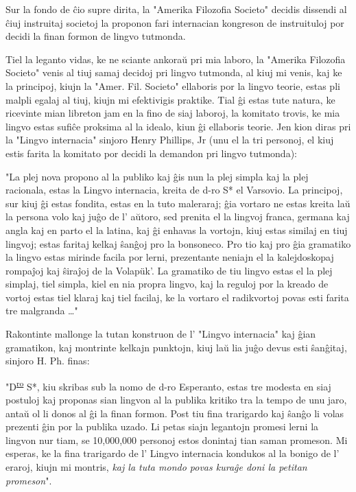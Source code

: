 \documentclass[12pt,twoside]{book}
\begin{document}
Sur la fondo de ĉio supre dirita, la "Amerika Filozofia Societo" decidis dissendi al ĉiuj instruitaj societoj la proponon fari internacian kongreson de instruituloj por decidi la finan formon de lingvo tutmonda.

Tiel la leganto vidas, ke ne sciante ankoraŭ pri mia laboro, la "Amerika Filozofia Societo" venis al tiuj samaj decidoj pri lingvo tutmonda, al kiuj mi venis, kaj ke la principoj, kiujn la "Amer. Fil. Societo" ellaboris por la lingvo teorie, estas pli malpli egalaj al tiuj, kiujn mi efektivigis praktike. Tial ĝi estas tute natura, ke ricevinte mian libreton jam en la fino de siaj laboroj, la komitato trovis, ke mia lingvo estas sufiĉe proksima al la idealo, kiun ĝi ellaboris teorie. Jen kion diras pri la "Lingvo internacia" sinjoro Henry Phillips, Jr (unu el la tri personoj, el kiuj estis farita la komitato por decidi la demandon pri lingvo tutmonda):

    "La plej nova propono al la publiko kaj ĝis nun la plej simpla kaj la plej racionala, estas la \glqq{}Lingvo internacia,\grqq{} kreita de d-ro S* el Varsovio. La principoj, sur kiuj ĝi estas fondita, estas en la tuto maleraraj; ĝia vortaro ne estas kreita laŭ la persona volo kaj juĝo de l' aŭtoro, sed prenita el la lingvoj franca, germana kaj angla kaj en parto el la latina, kaj ĝi enhavas la vortojn, kiuj estas similaj en tiuj lingvoj; estas faritaj kelkaj ŝanĝoj pro la bonsoneco. Pro tio kaj pro ĝia gramatiko la lingvo estas mirinde facila por lerni, prezentante neniajn el la kalejdoskopaj rompaĵoj kaj ŝiraĵoj de la Volapük'. La gramatiko de tiu lingvo estas el la plej simplaj, tiel simpla, kiel en nia propra lingvo, kaj la reguloj por la kreado de vortoj estas tiel klaraj kaj tiel facilaj, ke la vortaro el radikvortoj povas esti farita tre malgranda \ldots{}" 

Rakontinte mallonge la tutan konstruon de l' "Lingvo internacia" kaj ĝian gramatikon, kaj montrinte kelkajn punktojn, kiuj laŭ lia juĝo devus esti ŝanĝitaj, sinjoro H. Ph. finas:

    "D\textsuperscript{\underline{ro}} S*, kiu skribas sub la nomo de d-ro Esperanto, estas tre modesta en siaj postuloj kaj proponas sian lingvon al la publika kritiko tra la tempo de unu jaro, antaŭ ol li donos al ĝi la finan formon. Post tiu fina trarigardo kaj ŝanĝo li volas prezenti ĝin por la publika uzado. Li petas siajn legantojn promesi lerni la lingvon nur tiam, se 10,000,000 personoj estos donintaj tian saman promeson. Mi esperas, ke la fina trarigardo de l' \glqq{}Lingvo internacia\grqq{} kondukos al la bonigo de l' eraroj, kiujn mi montris, \emph{kaj la tuta mondo povas kuraĝe doni la petitan promeson}". 
\end{document}
